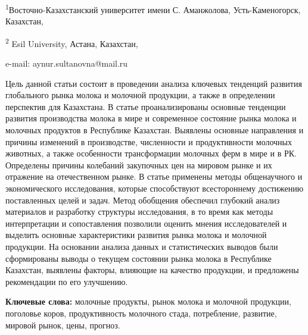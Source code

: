 \begin{affiliation}
\textsuperscript{1}Восточно-Казахстанский университет имени С. Аманжолова, Усть-Каменогорск, Казахстан,

\textsuperscript{2} Esil University, Астана, Казахстан,

e-mail: aynur.sultanovna@mail.ru
\end{affiliation}

Цель данной статьи состоит в проведении анализа ключевых тенденций
развития глобального рынка молока и молочной продукции, а также в
определении перспектив для Казахстана. В статье проанализированы
основные тенденции развития производства молока в мире и современное
состояние рынка молока и молочных продуктов в Республике Казахстан.
Выявлены основные направления и причины изменений в производстве,
численности и продуктивности молочных животных, а также особенности
трансформации молочных ферм в мире и в РК. Определены причины колебаний
закупочных цен на мировом рынке и их отражение на отечественном рынке. В
статье применены методы общенаучного и экономического исследования,
которые способствуют всестороннему достижению поставленных целей и
задач. Метод обобщения обеспечил глубокий анализ материалов и разработку
структуры исследования, в то время как методы интерпретации и
сопоставления позволили оценить мнения исследователей и выделить
основные характеристики развития рынка молока и молочной продукции. На
основании анализа данных и статистических выводов были сформированы
выводы о текущем состоянии рынка молока в Республике Казахстан, выявлены
факторы, влияющие на качество продукции, и предложены рекомендации по
его улучшению.

{\bfseries Ключевые слова:} молочные продукты, рынок молока и молочной
продукции, поголовье коров, продуктивность молочного стада, потребление,
развитие, мировой рынок, цены, прогноз.

